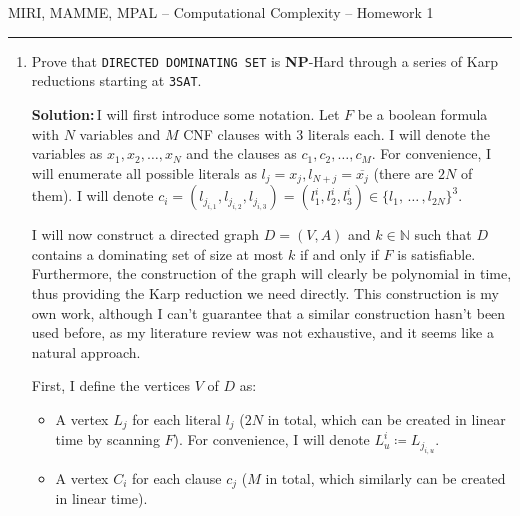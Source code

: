 \documentclass{amsart}
\theoremstyle{plain}
\theoremstyle{definition}
\newcommand{\N}{\mathbb{N}}
\newcommand{\np}{\textbf{NP}}
\newcommand{\sol}{\textbf{Solution:\,}}
\begin{document}
    {\Large MIRI, MAMME, MPAL -- Computational Complexity -- Homework 1}

    \vspace{0.5cm}

    \hrule

    \vspace{0.5cm}

    \begin{enumerate}[label=\textbf{Exercise \arabic*:}, leftmargin=0cm, labelwidth=-0.2cm, align=left]

        \item
            Prove that \verb|DIRECTED DOMINATING SET| is \np-Hard through a series of Karp reductions
            starting at \verb|3SAT|.

            \sol I will first introduce some notation.
            Let $F$ be a boolean formula with $N$ variables and $M$ CNF
            clauses with $3$ literals each.
            I will denote the variables as $x_1, x_2, \ldots, x_N$ and the clauses as $c_1, c_2, \ldots, c_M$.
            For convenience, I will enumerate all possible literals as $l_j = x_j, l_{N+j} = \overline{x_j}$
            (there are $2N$ of them).
            I will denote
            $c_i = \left( l_{j_{i, 1}}, l_{j_{i, 2}}, l_{j_{i, 3}} \right) =
            \left( l^i_1, l^i_2, l^i_3 \right)
            \in \{l_1, \, \dots \, , l_{2N}\}^3$.

            I will now construct a directed graph $D = (V, A)$ and $k \in \N$ such that
            $D$ contains a dominating set of size at most $k$ if and only if $F$ is satisfiable.
            Furthermore, the construction of the graph will clearly be polynomial in time,
            thus providing the Karp reduction we need directly.
            This construction is my own work, although I can't guarantee that
            a similar construction hasn't been used before, as my literature review was not exhaustive,
            and it seems like a natural approach.


            First, I define the vertices $V$ of $D$ as:
            \begin{itemize}
                \item A vertex $L_j$ for each literal $l_j$
                ($2N$ in total, which can be created in linear time by scanning $F$).
                For convenience, I will denote $L^i_u \coloneqq L_{j_{i, u}}$.

                \item A vertex $C_i$ for each clause $c_j$ ($M$ in total, which similarly can be created in linear time).


\end{itemize}
\end{enumerate}
\end{document}
